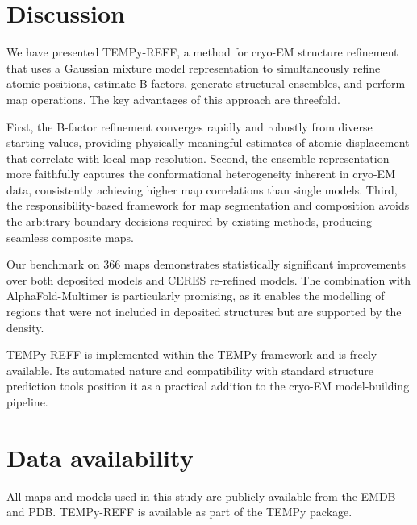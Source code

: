 \documentclass[11pt]{article}
\begin{document}
\section{Discussion}

We have presented TEMPy-REFF, a method for cryo-EM structure refinement that uses a Gaussian mixture model representation to simultaneously refine atomic positions, estimate B-factors, generate structural ensembles, and perform map operations. The key advantages of this approach are threefold.

First, the B-factor refinement converges rapidly and robustly from diverse starting values, providing physically meaningful estimates of atomic displacement that correlate with local map resolution. Second, the ensemble representation more faithfully captures the conformational heterogeneity inherent in cryo-EM data, consistently achieving higher map correlations than single models. Third, the responsibility-based framework for map segmentation and composition avoids the arbitrary boundary decisions required by existing methods, producing seamless composite maps.

Our benchmark on 366 maps demonstrates statistically significant improvements over both deposited models and CERES re-refined models. The combination with AlphaFold-Multimer \citep{evans2022} is particularly promising, as it enables the modelling of regions that were not included in deposited structures but are supported by the density.

TEMPy-REFF is implemented within the TEMPy framework \citep{farabella2015} and is freely available. Its automated nature and compatibility with standard structure prediction tools position it as a practical addition to the cryo-EM model-building pipeline.

\section*{Data availability}

All maps and models used in this study are publicly available from the EMDB and PDB. TEMPy-REFF is available as part of the TEMPy package.


\end{document}
